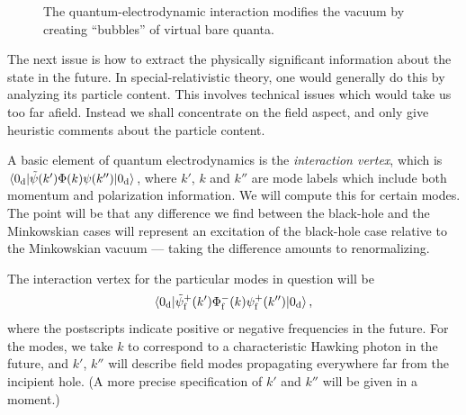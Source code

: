 \documentclass[12pt]{article}
\begin{document}
\begin{figure}[t]
\caption{The quantum-electrodynamic interaction modifies the vacuum by creating ``bubbles'' of virtual bare quanta.}
\label{fig:vacbubble}
\end{figure}

The next issue is how to extract the physically significant information about the state in the future.  In special-relativistic theory, one would generally do this by analyzing its particle content.  This involves technical issues which would take us too far afield.  Instead we shall concentrate on the field aspect, and only give heuristic comments about the particle content.

A basic element of quantum electrodynamics is
the {\em interaction vertex}, which is $\langle 0_{\rm d}|{\tilde\psi}(k')\Phi (k)\psi (k'')|0_{\rm d}\rangle$, where $k'$, $k$ and $k''$ are mode labels which include both momentum and polarization information.  We will compute this for certain modes.  The point will be that any difference we find between the black-hole and the Minkowskian cases will represent an excitation of the black-hole case relative to the Minkowskian vacuum --- taking the difference amounts to renormalizing.

The interaction vertex for the particular modes in question will be 
\begin{equation}\label{vert}
\langle 0_{\rm d}|{\tilde\psi}_{\rm f}^+(k')\Phi _{\rm f}^- (k)\psi _{\rm f}^+ (k'')|0_{\rm d}\rangle\, ,
\end{equation} 
where the postscripts indicate positive or negative frequencies in the future.  For the modes, we take $k$ to correspond to a characteristic Hawking photon in the future, and $k'$, $k''$ will describe field modes propagating everywhere far from the incipient hole.  (A more precise specification of 
$k'$ and $k''$ will be given in a moment.)
\end{document}

